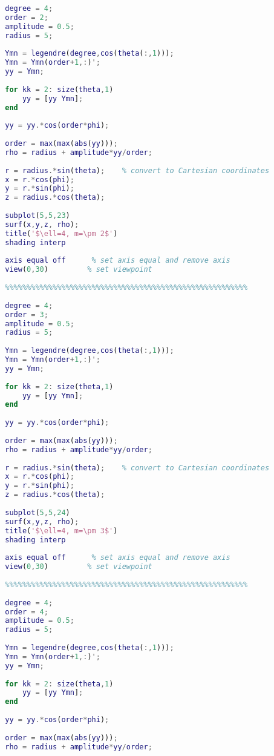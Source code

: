 \begin{lstlisting}[language=MATLAB]
		%%%%%%%%%%%%%%%%%%%%%%%%%%%%%%%%%%%%%%%%%%%%%%%%%%%%%%%%
		
		degree = 4;
		order = 2;
		amplitude = 0.5;
		radius = 5;
		
		Ymn = legendre(degree,cos(theta(:,1)));
		Ymn = Ymn(order+1,:)';
		yy = Ymn;
		
		for kk = 2: size(theta,1)
		    yy = [yy Ymn];
		end
		
		yy = yy.*cos(order*phi);
		
		order = max(max(abs(yy)));
		rho = radius + amplitude*yy/order;
		
		r = radius.*sin(theta);    % convert to Cartesian coordinates
		x = r.*cos(phi);
		y = r.*sin(phi);
		z = radius.*cos(theta);
		
		subplot(5,5,23)
		surf(x,y,z, rho);
		title('$\ell=4, m=\pm 2$')
		shading interp
		
		axis equal off      % set axis equal and remove axis
		view(0,30)         % set viewpoint
		
		%%%%%%%%%%%%%%%%%%%%%%%%%%%%%%%%%%%%%%%%%%%%%%%%%%%%%%%%
		
		degree = 4;
		order = 3;
		amplitude = 0.5;
		radius = 5;
		
		Ymn = legendre(degree,cos(theta(:,1)));
		Ymn = Ymn(order+1,:)';
		yy = Ymn;
		
		for kk = 2: size(theta,1)
		    yy = [yy Ymn];
		end
		
		yy = yy.*cos(order*phi);
		
		order = max(max(abs(yy)));
		rho = radius + amplitude*yy/order;
		
		r = radius.*sin(theta);    % convert to Cartesian coordinates
		x = r.*cos(phi);
		y = r.*sin(phi);
		z = radius.*cos(theta);
		
		subplot(5,5,24)
		surf(x,y,z, rho);
		title('$\ell=4, m=\pm 3$')
		shading interp
		
		axis equal off      % set axis equal and remove axis
		view(0,30)         % set viewpoint
		
		%%%%%%%%%%%%%%%%%%%%%%%%%%%%%%%%%%%%%%%%%%%%%%%%%%%%%%%%
		
		degree = 4;
		order = 4;
		amplitude = 0.5;
		radius = 5;
		
		Ymn = legendre(degree,cos(theta(:,1)));
		Ymn = Ymn(order+1,:)';
		yy = Ymn;
		
		for kk = 2: size(theta,1)
		    yy = [yy Ymn];
		end
		
		yy = yy.*cos(order*phi);
		
		order = max(max(abs(yy)));
		rho = radius + amplitude*yy/order;
		

\end{lstlisting}
